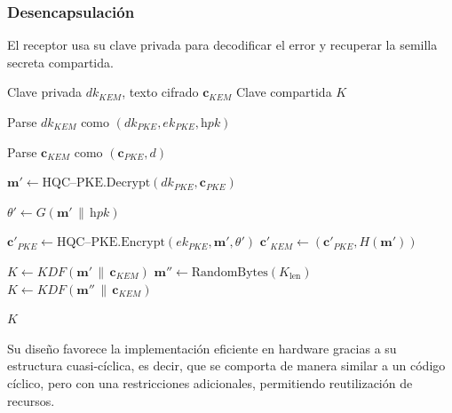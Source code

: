 \subsubsection{Desencapsulación}
El receptor usa su clave privada para decodificar el error y recuperar la semilla secreta compartida.

\begin{tcolorbox}[hqcbox,title=\textbf{Algoritmo HQC–KEM.Decaps}]
\begin{algorithmic}[1]
\Require Clave privada $\textit{dk}_{KEM}$, texto cifrado $\mathbf{c}_{KEM}$
\Ensure Clave compartida $K$

\State Parse $\textit{dk}_{KEM}$ como $(\textit{dk}_{PKE}, \textit{ek}_{PKE}, \textit{hpk})$

\State Parse $\mathbf{c}_{KEM}$ como $(\mathbf{c}_{PKE}, \textit{d})$

\State $\mathbf{m}' \gets \text{HQC–PKE.Decrypt}(\textit{dk}_{PKE}, \mathbf{c}_{PKE})$

\State $\theta' \gets G(\mathbf{m}' \,\|\, \textit{hpk})$

\State $\mathbf{c}'_{PKE} \gets \text{HQC–PKE.Encrypt}(\textit{ek}_{PKE}, \mathbf{m}', \theta')$
\State $\mathbf{c}'_{KEM} \gets (\mathbf{c}'_{PKE}, H(\mathbf{m}'))$

    \State $K \gets KDF(\mathbf{m}' \,\|\, \mathbf{c}_{KEM})$
\Else
    \State $\mathbf{m}'' \gets \text{RandomBytes}(K_\text{len})$
    \State $K \gets KDF(\mathbf{m}'' \,\|\, \mathbf{c}_{KEM})$
\EndIf

\State \Return $K$
\end{algorithmic}
\end{tcolorbox}


Su diseño favorece la implementación eficiente en hardware gracias a su estructura cuasi-cíclica, es decir, que se comporta de manera similar a un código cíclico, pero con una restricciones adicionales, permitiendo reutilización de recursos.

